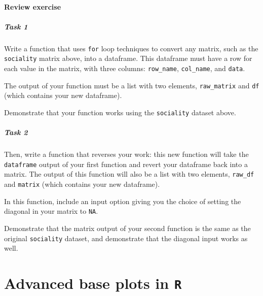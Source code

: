 \documentclass[]{book}
\let\oldparagraph\paragraph
\renewcommand{\paragraph}[1]{\oldparagraph{#1}\mbox{}}
\begin{document}
\hypertarget{review-exercise-2}{%
\subsubsection*{Review exercise}\label{review-exercise-2}}

\hypertarget{task-1-2}{%
\paragraph{Task 1}\label{task-1-2}}

Write a function that uses \texttt{for} loop techniques to convert any matrix, such as the \texttt{sociality} matrix above, into a dataframe. This dataframe must have a row for each value in the matrix, with three columns: \texttt{row\_name}, \texttt{col\_name}, and \texttt{data}.

The output of your function must be a list with two elements, \texttt{raw\_matrix} and \texttt{df} (which contains your new dataframe).

Demonstrate that your function works using the \texttt{sociality} dataset above.

\hypertarget{task-2-2}{%
\paragraph{Task 2}\label{task-2-2}}

Then, write a function that reverses your work: this new function will take the \texttt{dataframe} output of your first function and revert your dataframe back into a matrix. The output of this function will also be a list with two elements, \texttt{raw\_df} and \texttt{matrix} (which contains your new dataframe).

In this function, include an input option giving you the choice of setting the diagonal in your matrix to \texttt{NA}.

Demonstrate that the matrix output of your second function is the same as the original \texttt{sociality} dataset, and demonstrate that the diagonal input works as well.

\hypertarget{advanced-base-plots-in-r}{%
\chapter{\texorpdfstring{Advanced base plots in \texttt{R}}{Advanced base plots in R}}\label{advanced-base-plots-in-r}}
\end{document}
